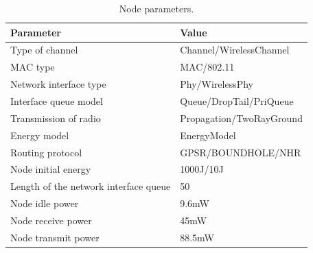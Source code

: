 \begin{table}[!htb]
\centering
\caption{Node parameters.}
\label{table-node-energy}
\begin{tabular}{|l|l|}
\hline
Parameter                             & Value                    \\ \hline
Type of channel                       & Channel/WirelessChannel  \\ \hline
MAC type                              & MAC/802.11               \\ \hline
Network interface type                & Phy/WirelessPhy          \\ \hline
Interface queue model                 & Queue/DropTail/PriQueue  \\ \hline
Transmission of radio                 & Propagation/TwoRayGround \\ \hline
Energy model                          & EnergyModel              \\ \hline
Routing protocol                      & GPSR/BOUNDHOLE/NHR       \\ \hline
Node initial energy                   & 1000J/10J                \\ \hline
Length of the network interface queue & 50                       \\ \hline
Node idle power                       & 9.6mW                    \\ \hline
Node receive power                    & 45mW                     \\ \hline
Node transmit power                   & 88.5mW                   \\ \hline
\end{tabular}
\end{table}

